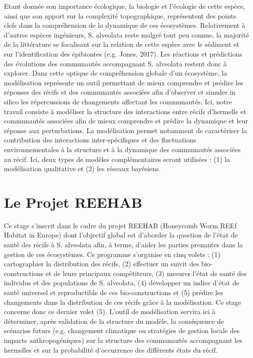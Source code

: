 Etant donnée son importance écologique, la biologie et l’écologie de cette espèce, ainsi que son apport sur la complexité topographique, représentent des points clefs dans la compréhension de la dynamique de ces écosystèmes. Relativement à d’autres espèces ingénieurs, S. alveolata reste malgré tout peu connue, la majorité de la littérature se focalisant sur la relation de cette espèce avec le sédiment et sur l’identification des épibiontes (e.g. Jones, 2017). Les réactions et prédictions des évolutions des communautés accompagnant S. alveolata restent donc à explorer. Dans cette optique de compréhension globale d’un écosystème, la modélisation représente un outil permettant de mieux comprendre et prédire les réponses des récifs et des communautés associées afin d’observer et simuler in silico les répercussions de changements affectant les communautés. Ici, notre travail consiste à modéliser la structure des interactions entre récifs d’hermelle et communautés associées afin de mieux comprendre et prédire la dynamique et leur réponse aux perturbations. La modélisation permet notamment de caractériser la contribution des interactions inter-spécifiques et des fluctuations environnementales à la structure et à la dynamique des communautés associées au récif. Ici, deux types de modèles complémentaires seront utilisées : (1) la modélisation qualitative et (2) les réseaux bayésiens.

	    \section{Le Projet REEHAB}
Ce stage s’inscrit dans le cadre du projet REEHAB (Honeycomb Worm REEf Habitat in Europe) dont l’objectif global est d’aborder la question de l’état de santé des récifs à S. alveolata afin, à terme, d’aider les parties prenantes dans la gestion de ces écosystèmes. Ce programme s’organise en cinq volets : (1) cartographier la distribution des récifs, (2) effectuer un suivit des bio-constructions et de leurs principaux compétiteurs, (3) mesurer l’état de santé des individus et des populations de S. alveolata, (4) développer un indice d’état de santé universel et reproductible de ces bio-constructions et (5) prédire les changements dans la distribution de ces récifs grâce à la modélisation. Ce stage concerne donc ce dernier volet (5). L’outil de modélisation servira ici à déterminer, après validation de la structure du modèle, la conséquence de scénarios futurs (e.g. changement climatique ou stratégies de gestion locale des impacts anthropogéniques) sur la structure des communautés accompagnant les hermelles et sur la probabilité d’occurrence des différents états du récif. 

